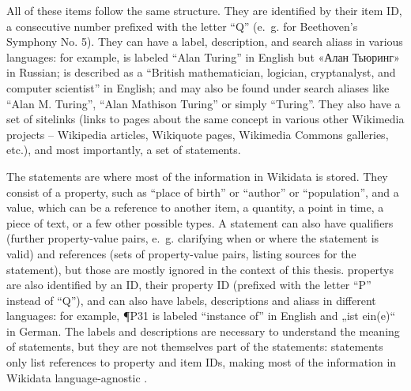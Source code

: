All of these \glspl{item} follow the same structure.
They are identified by their \gls{item ID},
a consecutive number prefixed with the letter “Q”
(e.~g.  for Beethoven’s Symphony No. 5).
They can have a \gls{label}, \gls{description}, and search \glspl{alias} in various languages:
for example,  is labeled “Alan Turing” in English
but «\foreignlanguage{russian}{Алан Тьюринг}» in Russian;
is described as a “British mathematician, logician, cryptanalyst, and computer scientist” in English;
and may also be found under search aliases like “Alan M. Turing”, “Alan Mathison Turing” or simply “Turing”.
They also have a set of \glspl{sitelink}
(links to pages about the same concept in various other \gls{Wikimedia} projects –
\gls{Wikipedia} articles, \gls{Wikiquote} pages, \gls{Wikimedia Commons} galleries, etc.),
and most importantly, a set of \glspl{statement}.

The \glspl{statement} are where most of the information in \gls{Wikidata} is stored.
They consist of a \gls{property}, such as “place of birth” or “author” or “population”,
and a value, which can be a reference to another \gls{item}, a quantity, a point in time, a piece of text,
or a few other possible types.
A \gls{statement} can also have \glspl{qualifier}
(further property-value pairs, e.~g. clarifying when or where the statement is valid)
and \glspl{reference} (sets of property-value pairs, listing sources for the \gls{statement}),
but those are mostly ignored in the context of this thesis.
\Glspl{property} are also identified by an ID, their \gls{property ID}
(prefixed with the letter “P” instead of “Q”),
and can also have \glspl{label}, \glspl{description} and \glspl{alias} in different languages:
for example, \P{P31} is labeled “instance of” in English
and „\foreignlanguage{ngerman}{ist ein(e)}“ in German.
The \glspl{label} and \glspl{description} are necessary to understand the meaning of \glspl{statement},
but they are not themselves part of the \glspl{statement}:
\glspl{statement} only list references to \gls{property} and \glspl{item ID},
making most of the information in \gls{Wikidata} language-agnostic \cite{Kaffee:2017:GBA:3125433.3125465}.

